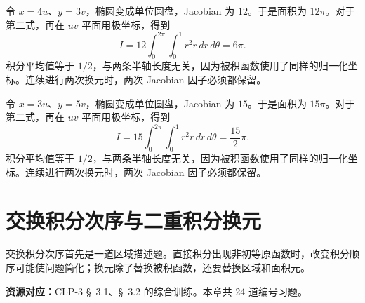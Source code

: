 \documentclass[12pt,fontset=fandol]{ctexart}
\begin{document}
\begin{solve}\label{ans:c36q24}
令 $x=4u$、$y=3v$，椭圆变成单位圆盘，Jacobian 为 $12$。于是面积为 $12\pi$。对于第二式，再在 $uv$ 平面用极坐标，得到
\[
I=12\int_0^{2\pi}\int_0^1r^2r\,dr\,d\theta=6\pi.
\]
积分平均值等于 $1/2$，与两条半轴长度无关，因为被积函数使用了同样的归一化坐标。连续进行两次换元时，两次 Jacobian 因子必须都保留。
\end{solve}

\begin{solve}\label{ans:c36q25}
令 $x=3u$、$y=5v$，椭圆变成单位圆盘，Jacobian 为 $15$。于是面积为 $15\pi$。对于第二式，再在 $uv$ 平面用极坐标，得到
\[
I=15\int_0^{2\pi}\int_0^1r^2r\,dr\,d\theta=\frac{15}{2}\pi.
\]
积分平均值等于 $1/2$，与两条半轴长度无关，因为被积函数使用了同样的归一化坐标。连续进行两次换元时，两次 Jacobian 因子必须都保留。
\end{solve}

\clearpage
\section{交换积分次序与二重积分换元}\label{sec:ch37}
交换积分次序首先是一道区域描述题。直接积分出现非初等原函数时，改变积分顺序可能使问题简化；换元除了替换被积函数，还要替换区域和面积元。

\textbf{资源对应：}CLP-3 \S~3.1、\S~3.2 的综合训练。本章共 24 道编号习题。
\end{document}
